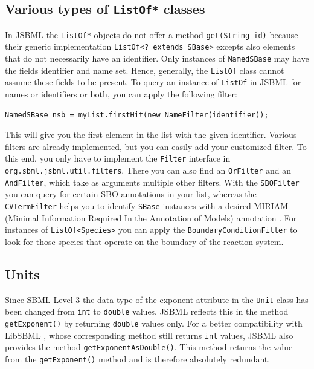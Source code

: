 \documentclass[
  BCOR12mm,
  letterpaper,
  11pt,
  headsepline,
  pointlessnumbers,
  tablecaptionabove,
  onelinecaption,
  headinclude,
  appendixprefix,
  idxtotoc,
  bibtotoc,
  twoside,
  titlepage
]{scrartcl}
\begin{document}
\subsection{Various types of \texttt{ListOf*} classes}

In JSBML the \texttt{ListOf*}
objects do not offer a method
\texttt{get(String id)} because their generic implementation 
\texttt{ListOf<? extends SBase>} excepts also elements that do
not necessarily have an identifier. Only instances of \texttt{NamedSBase} may have
the fields identifier and name set. Hence, generally, the \texttt{ListOf} class
cannot assume these fields to be present. To query an instance of \texttt{ListOf}
in JSBML for names or identifiers or both, you can apply the following filter:
\begin{lstlisting}
NamedSBase nsb = myList.firstHit(new NameFilter(identifier));
\end{lstlisting}
This will give you the first element in the list with the given identifier.
Various filters are already implemented, but you can easily add your 
customized filter. To this end, you only have to implement the \texttt{Filter}
interface in \texttt{org.sbml.jsbml.util.filters}. There you can also find an
\texttt{OrFilter} and an \texttt{AndFilter}, which take as arguments multiple other
filters. With the \texttt{SBOFilter} you can query for certain SBO  annotations \citep{Novere2006,Novere2006b} in
your list, whereas the \texttt{CVTermFilter} helps you to identify \texttt{SBase}
instances with a desired MIRIAM (Minimal Information Required In the Annotation of Models) annotation \citep{Novere2005}. For instances of
\texttt{ListOf<Species>} you can apply the \texttt{BoundaryConditionFilter} to look
for those species that operate on the boundary of the reaction system.


\subsection{Units}

Since SBML Level 3 \citep{Hucka2010a} the data type of the exponent attribute in the \texttt{Unit}
class has been changed from \texttt{int} to \texttt{double} values.
JSBML
reflects this in the method \texttt{getExponent()} by returning \texttt{double}
values only. For a better compatibility with LibSBML
,
whose corresponding method still
returns \texttt{int} values, JSBML also provides the method
\texttt{getExponentAsDouble()}. This method returns the value from the
\texttt{getExponent()} method and is therefore absolutely redundant.
\end{document}
